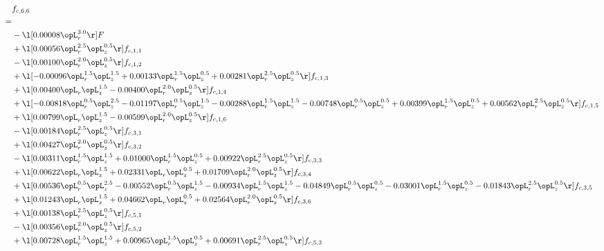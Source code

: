 \begin{alignat}{2} 
\label{eq:f_66_1} 
& f_{c,6,6} \nonumber \\ 
 = \\ 
& - \l[  0.00008 \opL_r^{3.0}  \r] F \nonumber \\ 
& + \l[  0.00056 \opL_r^{2.5} \opL_z^{0.5}  \r] f_{c,1,1} \nonumber \\ 
& - \l[  0.00100 \opL_r^{2.0} \opL_z^{0.5}  \r] f_{c,1,2} \nonumber \\ 
& + \l[  -0.00096 \opL_r^{1.5} \opL_z^{1.5} +  0.00133 \opL_r^{1.5} \opL_z^{0.5} +  0.00281 \opL_r^{2.5} \opL_z^{0.5}  \r] f_{c,1,3} \nonumber \\ 
& + \l[  0.00400 \opL_r \opL_z^{1.5}   -0.00400 \opL_r^{2.0} \opL_z^{0.5}  \r] f_{c,1,4} \nonumber \\ 
& + \l[  -0.00818 \opL_r^{0.5} \opL_z^{2.5}   -0.01197 \opL_r^{0.5} \opL_z^{1.5}   -0.00288 \opL_r^{1.5} \opL_z^{1.5}   -0.00748 \opL_r^{0.5} \opL_z^{0.5} +  0.00399 \opL_r^{1.5} \opL_z^{0.5} +  0.00562 \opL_r^{2.5} \opL_z^{0.5}  \r] f_{c,1,5} \nonumber \\ 
& + \l[  0.00799 \opL_r \opL_z^{1.5}   -0.00599 \opL_r^{2.0} \opL_z^{0.5}  \r] f_{c,1,6} \nonumber \\ 
& - \l[  0.00184 \opL_r^{2.5} \opL_z^{0.5}  \r] f_{c,3,1} \nonumber \\ 
& + \l[  0.00427 \opL_r^{2.0} \opL_z^{0.5}  \r] f_{c,3,2} \nonumber \\ 
& - \l[  0.00311 \opL_r^{1.5} \opL_z^{1.5} +  0.01000 \opL_r^{1.5} \opL_z^{0.5} +  0.00922 \opL_r^{2.5} \opL_z^{0.5}  \r] f_{c,3,3} \nonumber \\ 
& + \l[  0.00622 \opL_r \opL_z^{1.5} +  0.02331 \opL_r \opL_z^{0.5} +  0.01709 \opL_r^{2.0} \opL_z^{0.5}  \r] f_{c,3,4} \nonumber \\ 
& + \l[  0.00536 \opL_r^{0.5} \opL_z^{2.5}   -0.00552 \opL_r^{0.5} \opL_z^{1.5}   -0.00934 \opL_r^{1.5} \opL_z^{1.5}   -0.04849 \opL_r^{0.5} \opL_z^{0.5}   -0.03001 \opL_r^{1.5} \opL_z^{0.5}   -0.01843 \opL_r^{2.5} \opL_z^{0.5}  \r] f_{c,3,5} \nonumber \\ 
& + \l[  0.01243 \opL_r \opL_z^{1.5} +  0.04662 \opL_r \opL_z^{0.5} +  0.02564 \opL_r^{2.0} \opL_z^{0.5}  \r] f_{c,3,6} \nonumber \\ 
& + \l[  0.00138 \opL_r^{2.5} \opL_z^{0.5}  \r] f_{c,5,1} \nonumber \\ 
& - \l[  0.00356 \opL_r^{2.0} \opL_z^{0.5}  \r] f_{c,5,2} \nonumber \\ 
& + \l[  0.00728 \opL_r^{1.5} \opL_z^{1.5} +  0.00965 \opL_r^{1.5} \opL_z^{0.5} +  0.00691 \opL_r^{2.5} \opL_z^{0.5}  \r] f_{c,5,3} \nonumber \\ 

\end{alignat}
